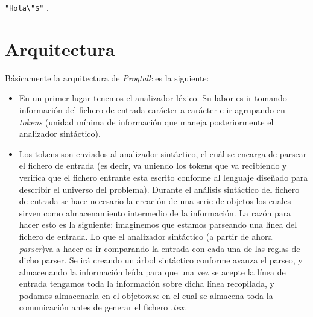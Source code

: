 \documentclass[12pt,a4paper]{report}
\begin{document}

\verb~"Hola\"$"~ .

\section{Arquitectura}

Básicamente la arquitectura de \textit{Progtalk} es la siguiente:
\begin{itemize}
\item En un primer lugar tenemos el analizador léxico. Su labor es ir tomando información del fichero de entrada carácter a carácter e ir agrupando en \textit{tokens} (unidad mínima de información que maneja posteriormente el analizador sintáctico).
\item Los tokens son enviados al analizador sintáctico, el cuál se encarga de parsear el fichero de entrada (es decir, va uniendo los tokens que va recibiendo y verifica que el fichero entrante esta escrito conforme al lenguaje diseñado para describir el universo del problema).
Durante el análisis sintáctico del fichero de entrada se hace necesario la creación de una serie de objetos los cuales sirven como almacenamiento intermedio de la información. La razón para hacer esto es la siguiente: imaginemos que estamos parseando una línea del fichero de entrada. Lo que el analizador sintáctico (a partir de ahora \textit{parser})va a hacer es ir comparando la entrada con cada una de las reglas de dicho parser. Se irá creando un árbol sintáctico conforme avanza el parseo, y almacenando la información leída para que una vez se acepte la línea de entrada tengamos toda la información sobre dicha línea recopilada, y podamos almacenarla en el objeto\textit{msc} en el cual se almacena toda la comunicación antes de generar el fichero \textit{.tex}.


\end{itemize}
\end{document}
